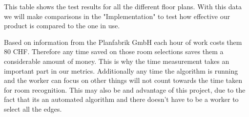 This table shows the test results for all the different floor plans. With this data we will make comparisons in the "Implementation" to test how effective our product is compared to the one in use.

Based on information from the Planfabrik GmbH each hour of work costs them 80 CHF. Therefore any time saved on those room selections saves them a considerable amount of money. This is why the time measurement takes an important part in our metrics. Additionally any time the algorithm is running and the worker can focus on other things will not count towards the time taken for room recognition. This may also be and advantage of this project, due to the fact that its an automated algorithm and there doesn't have to be a worker to select all the edges. 

